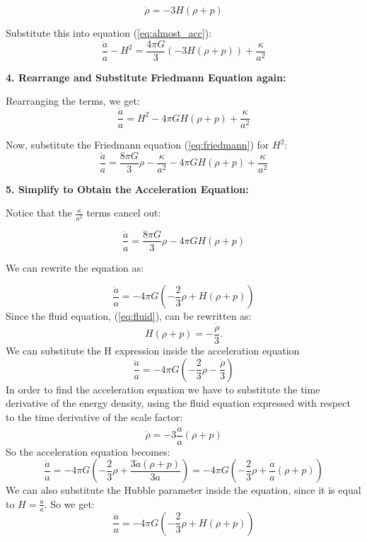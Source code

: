 \documentclass{article}
\begin{document}
\begin{equation}
\dot{\rho} = -3H(\rho + p)
\end{equation}

Substitute this into equation (\ref{eq:almost_acc}):
\begin{equation}
\frac{\ddot{a}}{a} - H^2 = \frac{4\pi G}{3} (-3H(\rho + p)) + \frac{\kappa}{a^2}
\end{equation}

\textbf{4. Rearrange and Substitute Friedmann Equation again:}

Rearranging the terms, we get:
\begin{equation}
\frac{\ddot{a}}{a} = H^2 - 4\pi G H(\rho + p) + \frac{\kappa}{a^2}
\end{equation}

Now, substitute the Friedmann equation (\ref{eq:friedmann}) for $H^2$:
\begin{equation}
\frac{\ddot{a}}{a} = \frac{8\pi G}{3}\rho - \frac{\kappa}{a^2} - 4\pi G H(\rho + p) + \frac{\kappa}{a^2}
\end{equation}

\textbf{5. Simplify to Obtain the Acceleration Equation:}

Notice that the $\frac{\kappa}{a^2}$ terms cancel out:

\begin{equation}
\frac{\ddot{a}}{a} = \frac{8\pi G}{3}\rho - 4\pi G H(\rho + p)
\end{equation}

We can rewrite the equation as:

\begin{equation}
\frac{\ddot{a}}{a} = -4\pi G \left( -\frac{2}{3}\rho + H(\rho + p) \right)
\end{equation}
Since the fluid equation, (\ref{eq:fluid}), can be rewritten as:
\begin{equation}
H(\rho + p) = -\frac{\dot{\rho}}{3}.
\end{equation}
We can substitute the H expression inside the acceleration equation
\begin{equation}
\frac{\ddot{a}}{a} = -4\pi G \left( -\frac{2}{3}\rho - \frac{\dot{\rho}}{3} \right)
\end{equation}
In order to find the acceleration equation we have to substitute the time derivative of the energy density, using the fluid equation expressed with respect to the time derivative of the scale factor:
\begin{equation}
\dot{\rho} = -3\frac{\dot{a}}{a}(\rho + p)
\end{equation}
So the acceleration equation becomes:
\begin{equation}
\frac{\ddot{a}}{a} = -4\pi G \left( -\frac{2}{3}\rho + \frac{3\dot{a}(\rho + p)}{3a} \right) = -4\pi G \left( -\frac{2}{3}\rho + \frac{\dot{a}}{a}(\rho + p) \right)
\end{equation}
We can also substitute the Hubble parameter inside the equation, since it is equal to $H = \frac{\dot{a}}{a}$. So we get:
\begin{equation}
\frac{\ddot{a}}{a} = -4\pi G \left( -\frac{2}{3}\rho + H(\rho + p) \right)
\end{equation}
\end{document}

